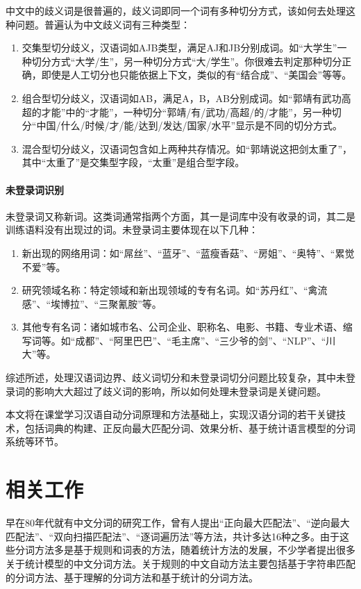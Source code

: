\documentclass[11pt,a4paper]{article}
\begin{document}
	中文中的歧义词是很普遍的，歧义词即同一个词有多种切分方式，该如何去处理这种问题。普遍认为中文歧义词有三种类型：
	\begin{enumerate}
		\item 交集型切分歧义，汉语词如AJB类型，满足AJ和JB分别成词。如“大学生”一种切分方式“大学/生”，另一种切分方式“大/学生”。你很难去判定那种切分正确，即使是人工切分也只能依据上下文，类似的有“结合成”、“美国会”等等。
		
		\item 组合型切分歧义，汉语词如AB，满足A，B，AB分别成词。如“郭靖有武功高超的才能”中的“才能”，一种切分“郭靖/有/武功/高超/的/才能”，另一种切分“中国/什么/时候/才/能/达到/发达/国家/水平”显示是不同的切分方式。
		
		\item 混合型切分歧义，汉语词包含如上两种共存情况。如“郭靖说这把剑太重了”，其中“太重了”是交集型字段，“太重”是组合型字段。
	\end{enumerate}
	
	
	\paragraph{未登录词识别}
	
	未登录词又称新词。这类词通常指两个方面，其一是词库中没有收录的词，其二是训练语料没有出现过的词。未登录词主要体现在以下几种：
	
	\begin{enumerate}
		\item 新出现的网络用词：如“屌丝”、“蓝牙”、“蓝瘦香菇”、“房姐”、“奥特”、“累觉不爱”等。
		
		\item 研究领域名称：特定领域和新出现领域的专有名词。如“苏丹红”、“禽流感”、“埃博拉”、“三聚氰胺”等。
		
		\item 其他专有名词：诸如城市名、公司企业、职称名、电影、书籍、专业术语、缩写词等。如“成都”、“阿里巴巴”、“毛主席”、“三少爷的剑”、“NLP”、“川大”等。
	\end{enumerate}
	
	综述所述，处理汉语词边界、歧义词切分和未登录词切分问题比较复杂，其中未登录词的影响大大超过了歧义词的影响，所以如何处理未登录词是关键问题。
	
	本文将在课堂学习汉语自动分词原理和方法基础上，实现汉语分词的若干关键技术，包括词典的构建、正反向最大匹配分词、效果分析、基于统计语言模型的分词系统等环节。
	
	\section{相关工作}
	早在80年代就有中文分词的研究工作，曾有人提出“正向最大匹配法”、“逆向最大匹配法”、“双向扫描匹配法”、“逐词遍历法”等方法，共计多达16种之多。由于这些分词方法多是基于规则和词表的方法，随着统计方法的发展，不少学者提出很多关于统计模型的中文分词方法。关于规则的中文自动方法主要包括基于字符串匹配的分词方法、基于理解的分词方法和基于统计的分词方法。
	
\end{document}
